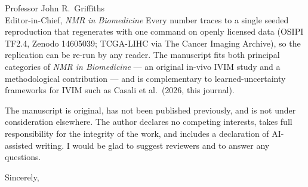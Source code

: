 \documentclass[11pt]{letter}
\begin{document}
\begin{letter}{Professor John R.\ Griffiths \\ Editor-in-Chief, \textit{NMR in Biomedicine}}
Every number traces to a single seeded reproduction that regenerates with one
command on openly licensed data (OSIPI TF2.4, Zenodo 14605039; TCGA-LIHC via The
Cancer Imaging Archive), so the replication can be re-run by any reader. The
manuscript fits both principal categories of \textit{NMR in Biomedicine} --- an
original in-vivo IVIM study and a methodological contribution --- and is
complementary to learned-uncertainty frameworks for IVIM such as Casali et al.\
(2026, this journal).

The manuscript is original, has not been published previously, and is not under
consideration elsewhere. The author declares no competing interests, takes full
responsibility for the integrity of the work, and includes a declaration of
AI-assisted writing. I would be glad to suggest reviewers and to answer any
questions.

\closing{Sincerely,}
\end{letter}
\end{document}
